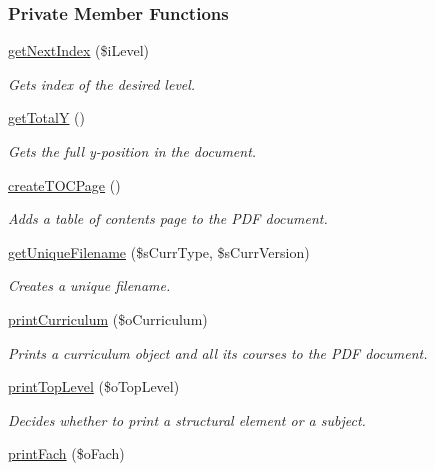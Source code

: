 \subsubsection*{Private Member Functions}
\begin{DoxyCompactItemize}
\item 
\hyperlink{classoverview_p_d_f_aedc9466cae51e07e57ba865a69c92efc}{get\+Next\+Index} (\$i\+Level)
\begin{DoxyCompactList}\small\item\em Gets index of the desired level. \end{DoxyCompactList}\item 
\hyperlink{classoverview_p_d_f_adca20f06977ea2b3b8737b1d465a1606}{get\+Total\+Y} ()
\begin{DoxyCompactList}\small\item\em Gets the full y-\/position in the document. \end{DoxyCompactList}\item 
\hyperlink{classoverview_p_d_f_acf4bdf38a6e11c036b076a16c3516f75}{create\+T\+O\+C\+Page} ()
\begin{DoxyCompactList}\small\item\em Adds a table of contents page to the P\+D\+F document. \end{DoxyCompactList}\item 
\hyperlink{classoverview_p_d_f_a10c644f1f84ae1b261a8b198a66b5cb1}{get\+Unique\+Filename} (\$s\+Curr\+Type, \$s\+Curr\+Version)
\begin{DoxyCompactList}\small\item\em Creates a unique filename. \end{DoxyCompactList}\item 
\hyperlink{classoverview_p_d_f_a1871e6880b3bb67d0a49cdcab4cd680d}{print\+Curriculum} (\$o\+Curriculum)
\begin{DoxyCompactList}\small\item\em Prints a curriculum object and all its courses to the P\+D\+F document. \end{DoxyCompactList}\item 
\hyperlink{classoverview_p_d_f_a23c7451efb8c436590fbad032bc6788b}{print\+Top\+Level} (\$o\+Top\+Level)
\begin{DoxyCompactList}\small\item\em Decides whether to print a structural element or a subject. \end{DoxyCompactList}\item 
\hyperlink{classoverview_p_d_f_abf0674d88080affc25c472fbd0525896}{print\+Fach} (\$o\+Fach)

\end{DoxyCompactItemize}
